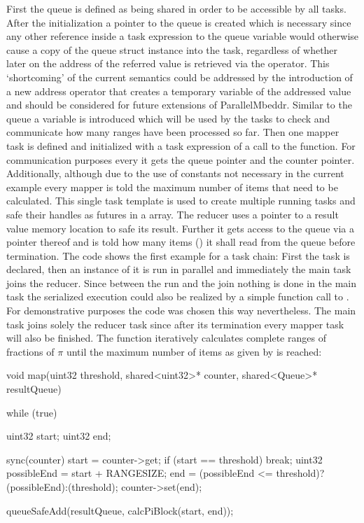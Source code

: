 First the queue is defined as being shared in order to be accessible by all tasks. After the initialization a pointer to the queue is created which is necessary since any other reference inside a task expression to the queue variable would otherwise cause a copy of the queue struct instance into the task, regardless of whether later on the address of the referred value is retrieved via the \CODE{\&} operator. This `shortcoming' of the current semantics could be addressed by the introduction of a new address operator that creates a temporary variable of the addressed value and should be considered for future extensions of ParallelMbeddr. Similar to the queue a  variable is introduced which will be used by the tasks to check and communicate how many ranges have been processed so far. Then one mapper task is defined and initialized with a task expression of a call to the  function. For communication purposes every it gets the queue pointer and the counter pointer. Additionally, although due to the use of constants not necessary in the current example every mapper is told the maximum number of items that need to be calculated. This single task template is used to create multiple running tasks and safe their handles as futures in a  array. The reducer uses a pointer to a result value memory location to safe its result. Further it gets access to the queue via a pointer thereof and is told how many items () it shall read from the queue before termination. The code shows the first example for a task chain: First the task is declared, then an instance of it is run in parallel and immediately the main task joins the reducer. Since between the run and the join nothing is done in the main task the serialized execution could also be realized by a simple function call to . For demonstrative purposes the code was chosen this way nevertheless. The main task joins solely the reducer task since after its termination every mapper task will also be finished.
The  function iteratively calculates complete ranges of fractions of $\pi$ until the maximum number of items as given by  is reached:
\begin{ccode}
void map(uint32 threshold, shared<uint32>* counter, shared<Queue>* resultQueue) { 
  while (true) { 
    uint32 start; 
    uint32 end; 
     
    sync(counter) { 
      start = counter->get; 
      if (start == threshold) { 
        break; 
      } 
      uint32 possibleEnd = start + RANGESIZE; 
      end = (possibleEnd <= threshold)?(possibleEnd):(threshold); 
      counter->set(end); 
    } 
     
    queueSafeAdd(resultQueue, calcPiBlock(start, end)); 
  } 
}
\end{ccode}
